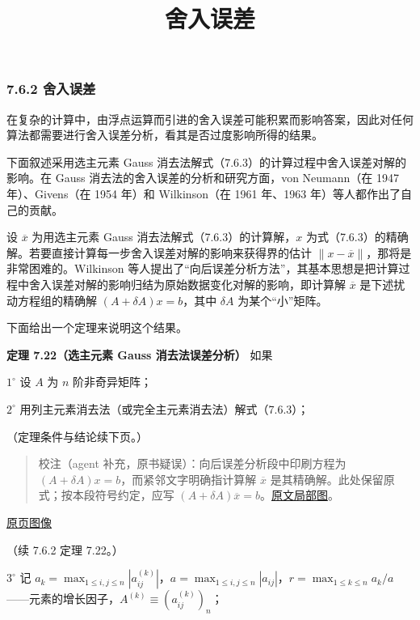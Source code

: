 \documentclass[
  10pt,
  fontset=fandol]{ctexart}
\title{舍入误差}
\author{}
\date{}
\begin{document}
\maketitle

\subsubsection{7.6.2 舍入误差}\label{ux820dux5165ux8befux5dee}

在复杂的计算中，由浮点运算而引进的舍入误差可能积累而影响答案，因此对任何算法都需要进行舍入误差分析，看其是否过度影响所得的结果。

下面叙述采用选主元素 Gauss 消去法解式（7.6.3）的计算过程中舍入误差对解的影响。在 Gauss 消去法的舍入误差的分析和研究方面，von Neumann（在 1947 年）、Givens（在 1954 年）和 Wilkinson（在 1961 年、1963 年）等人都作出了自己的贡献。

设 \(\overline x\) 为用选主元素 Gauss 消去法解式（7.6.3）的计算解，\(x\) 为式（7.6.3）的精确解。若要直接计算每一步舍入误差对解的影响来获得界的估计 \(\|x-\overline x\|\)，那将是非常困难的。Wilkinson 等人提出了``向后误差分析方法''，其基本思想是把计算过程中舍入误差对解的影响归结为原始数据变化对解的影响，即计算解 \(\overline x\) 是下述扰动方程组的精确解 \((A+\delta A)x=b\)，其中 \(\delta A\) 为某个``小''矩阵。

下面给出一个定理来说明这个结果。

\textbf{定理 7.22（选主元素 Gauss 消去法误差分析）} 如果

\(1^\circ\) 设 \(A\) 为 \(n\) 阶非奇异矩阵；

\(2^\circ\) 用列主元素消去法（或完全主元素消去法）解式（7.6.3）；

（定理条件与结论续下页。）

\begin{quote}
校注（agent 补充，原书疑误）：向后误差分析段中印刷方程为 \((A+\delta A)x=b\)，而紧邻文字明确指计算解 \(\overline x\) 是其精确解。此处保留原式；按本段符号约定，应写 \((A+\delta A)\overline x=b\)。\href{../assets/ch07b/210-backward-error.png}{原文局部图}。
\end{quote}

\href{../../source-images/pdf-211.jpeg}{原页图像}

（续 7.6.2 定理 7.22。）

\(3^\circ\) 记 \(a_k=\max_{1\leqslant i,j\leqslant n}|a_{ij}^{(k)}|\)，\(a=\max_{1\leqslant i,j\leqslant n}|a_{ij}|\)，\(r=\max_{1\leqslant k\leqslant n}a_k/a\)------元素的增长因子，\(A^{(k)}\equiv(a_{ij}^{(k)})_n\)；
\end{document}

